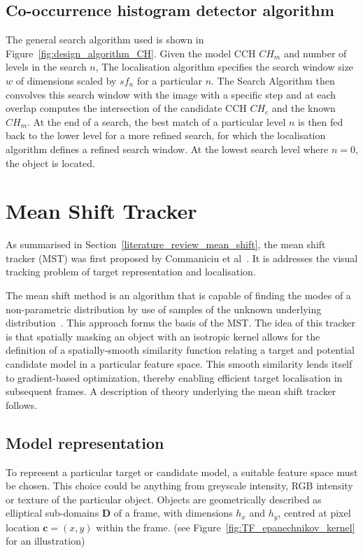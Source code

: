 \subsection{Co-occurrence histogram detector algorithm}
The general search algorithm used is shown in
Figure~\ref{fig:design_algorithm_CH}. Given the model CCH $CH_m$ and number of
levels in the search $n$, The localisation algorithm specifies the search window
size $w$ of dimensions scaled by $sf_n$ for a particular $n$. The Search
Algorithm then convolves this search window with the image with a specific step
and at each overlap computes the intersection of the candidate CCH $CH_c$ and
the known $CH_m$.  At the end of a search, the best match of a particular level
$n$ is then fed back to the lower level for a more refined search, for which the
localisation algorithm defines a refined search window. At the lowest search
level where $n=0$, the object is located.



\section{Mean Shift Tracker}\label{theoretical_framework_mean_shift_tracker}
As summarised in Section~\ref{literature_review_mean_shift}, the mean shift
tracker (MST) was first proposed by Commaniciu et al~\cite{Comaniciu2003}. It is
addresses the visual tracking problem of target representation and localisation.

The mean shift method is an algorithm that is capable of finding the modes of a 
non-parametric distribution by use of samples of the unknown underlying
distribution~\cite{Comaniciu2002}. This approach forms the basis of the MST\@.
The idea of this tracker is that spatially masking an object with an
isotropic kernel allows for the definition of a spatially-smooth similarity
function relating a target and potential candidate model in a particular feature
space. This smooth similarity lends itself to gradient-based optimization,
thereby enabling efficient target localisation in subsequent frames.
A description of theory underlying the mean shift tracker follows.

\subsection{Model representation}
To represent a particular target or candidate model, a suitable feature space
must be chosen. This choice could be anything from greyscale intensity, RGB
intensity or texture of the particular object. Objects are geometrically described 
as elliptical sub-domains $\mathbf{D}$ of a frame, with dimensions $h_x$ and
$h_y$, centred at pixel location $\mathbf{c}=(x,y)$ within the frame. (see
Figure~\ref{fig:TF_epanechnikov_kernel} for an illustration)

